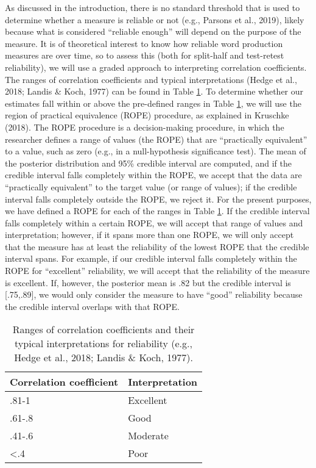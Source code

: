 \documentclass[
  man,floatsintext]{apa6}
\begin{document}
As discussed in the introduction, there is no standard threshold that is used to determine whether a measure is reliable or not (e.g., Parsons et al., 2019), likely because what is considered ``reliable enough'' will depend on the purpose of the measure. It is of theoretical interest to know how reliable word production measures are over time, so to assess this (both for split-half and test-retest reliability), we will use a graded approach to interpreting correlation coefficients. The ranges of correlation coefficients and typical interpretations (Hedge et al., 2018; Landis \& Koch, 1977) can be found in Table \ref{tab:ropes}. To determine whether our estimates fall within or above the pre-defined ranges in Table \ref{tab:ropes}, we will use the region of practical equivalence (ROPE) procedure, as explained in Kruschke (2018). The ROPE procedure is a decision-making procedure, in which the researcher defines a range of values (the ROPE) that are ``practically equivalent'' to a value, such as zero (e.g., in a null-hypothesis significance test). The mean of the posterior distribution and 95\% credible interval are computed, and if the credible interval falls completely within the ROPE, we accept that the data are ``practically equivalent'' to the target value (or range of values); if the credible interval falls completely outside the ROPE, we reject it. For the present purposes, we have defined a ROPE for each of the ranges in Table \ref{tab:ropes}. If the credible interval falls completely within a certain ROPE, we will accept that range of values and interpretation; however, if it spans more than one ROPE, we will only accept that the measure has at least the reliability of the lowest ROPE that the credible interval spans. For example, if our credible interval falls completely within the ROPE for ``excellent'' reliability, we will accept that the reliability of the measure is excellent. If, however, the posterior mean is .82 but the credible interval is {[}.75,.89{]}, we would only consider the measure to have ``good'' reliability because the credible interval overlaps with that ROPE.



\begin{table}

\caption{\label{tab:ropes}Ranges of correlation coefficients and their typical interpretations for reliability (e.g., Hedge et al., 2018; Landis \& Koch, 1977).}
\centering
\begin{tabular}[t]{ll}
\toprule
Correlation coefficient & Interpretation\\
\midrule
.81-1 & Excellent\\
.61-.8 & Good\\
.41-.6 & Moderate\\
<.4 & Poor\\
\bottomrule
\end{tabular}
\end{table}
\end{document}
